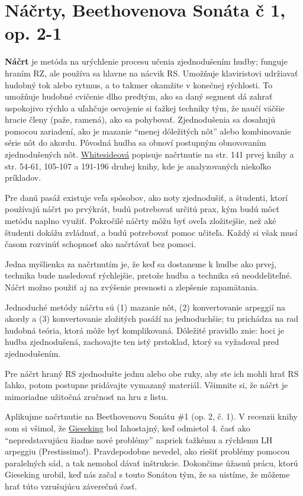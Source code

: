 \documentclass[11pt,a4paper]{book}
\begin{document}
\section{Náčrty, Beethovenova Sonáta č 1, op. 2-1}\label{s:outlining}
\textbf{Náčrt} je metóda na urýchlenie procesu učenia zjednodušením hudby; funguje hraním RZ, ale používa sa hlavne na nácvik RS. Umožňuje klaviristovi udržiavať hudobný tok alebo rytmus, a to takmer okamžite v konečnej rýchlosti. To umožňuje hudobné cvičenie dlho predtým, ako sa daný segment dá zahrať uspokojivo rýchlo a uľahčuje osvojenie si ťažkej techniky tým, že naučí väčšie hracie členy (paže, ramená), ako sa pohybovať. Zjednodušenia sa dosahujú pomocou zariadení, ako je mazanie “menej dôležitých nôt” alebo kombinovanie série nôt do akordu. Pôvodná hudba sa obnoví postupným obnovovaním zjednodušených nôt. \hyperlink{r:whiteside}{Whitesideová} popisuje načrtnutie na str. 141 prvej knihy a str. 54-61, 105-107 a 191-196 druhej knihy, kde je analyzovaných niekoľko príkladov.

Pre danú pasáž existuje veľa spôsobov, ako noty zjednodušiť, a študenti, ktorí používajú náčrt po prvýkrát, budú potrebovať určitú prax, kým budú môcť metódu naplno využiť. Pokročilé náčrty môžu byť oveľa zložitejšie, než aké študenti dokážu zvládnuť, a budú potrebovať pomoc učiteľa. Každý si však musí časom rozvinúť schopnosť ako načrtávať bez pomoci.

Jedna myšlienka za načrtnutím je, že keď sa dostaneme k hudbe ako prvej, technika bude nasledovať rýchlejšie, pretože hudba a technika sú neoddeliteľné. Náčrt možno použiť aj na zvýšenie presnosti a zlepšenie zapamätania.

Jednoduché metódy náčrtu sú (1) mazanie nôt, (2) konvertovanie arpeggií na akordy a (3) konvertovanie zložitých pasáží na jednoduchšie; tu prichádza na rad hudobná teória, ktorá môže byť komplikovaná. Dôležité pravidlo znie: hoci je hudba zjednodušená, zachovajte ten istý prstoklad, ktorý sa vyžadoval pred zjednodušením.

Pre náčrt hraný RS zjednodušte jednu alebo obe ruky, aby ste ich mohli hrať RS ľahko, potom postupne pridávajte vymazaný materiál. Všimnite si, že náčrt je mimoriadne užitočná zručnosť na hru z listu.

Aplikujme načrtnutie na Beethovenovu Sonátu \#1 (op. 2, č. 1). V recenzii knihy som si všimol, že \hyperlink{r:gieseking}{Gieseking} bol ľahostajný, keď odmietol 4. časť ako “nepredstavujúcu žiadne nové problémy” napriek ťažkému a rýchlemu LH arpeggiu (Prestissimo!). Pravdepodobne nevedel, ako riešiť problémy pomocou paralelných sád, a tak nemohol dávať inštrukcie. Dokončime úžasnú prácu, ktorú Gieseking urobil, keď nás začal s touto Sonátou tým, že sa uistíme, že môžeme hrať túto vzrušujúcu záverečnú časť.
\end{document}
